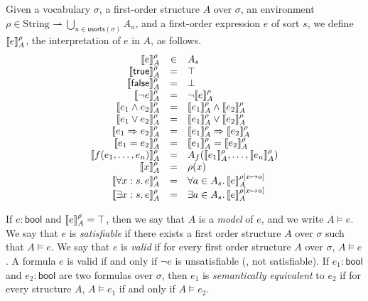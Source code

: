 Given a vocabulary $\sigma$,
  a first-order structure $A$ over $\sigma$,
  an environment $\rho \in \mathrm{String} \rightharpoonup \bigcup_{u\in\mathsf{usorts}(\sigma)} A_u$,
  and a first-order expression $e$ of sort $s$,
  we define $\llbracket{e}\rrbracket_A^\rho$,
  the interpretation of $e$ in $A$, as follows.
\begin{gather*}
  \begin{array}{rcl}
  \llbracket{e}\rrbracket_A^\rho &\in& A_s\\
  \llbracket{\mathsf{true}}\rrbracket_A^\rho &=& \top\\
  \llbracket{\mathsf{false}}\rrbracket_A^\rho &=& \bot\\
  \llbracket{\lnot e}\rrbracket_A^\rho &=& \lnot \llbracket{e}\rrbracket_A^\rho\\
  \llbracket{e_1 \land e_2}\rrbracket_A^\rho &=& \llbracket{e_1}\rrbracket_A^\rho \land \llbracket{e_2}\rrbracket_A^\rho\\
  \llbracket{e_1 \lor e_2}\rrbracket_A^\rho &=& \llbracket{e_1}\rrbracket_A^\rho \lor \llbracket{e_2}\rrbracket_A^\rho\\
  \llbracket{e_1 \Rightarrow e_2}\rrbracket_A^\rho &=& \llbracket{e_1}\rrbracket_A^\rho \Rightarrow \llbracket{e_2}\rrbracket_A^\rho\\
  \llbracket{e_1 = e_2}\rrbracket_A^\rho &=& \llbracket{e_1}\rrbracket_A^\rho = \llbracket{e_2}\rrbracket_A^\rho\\
  \llbracket{f(e_1, \dots, e_n)}\rrbracket_A^\rho &=& A_f(\llbracket{e_1}\rrbracket_A^\rho, \dots, \llbracket{e_n}\rrbracket_A^\rho)  \\
  \llbracket{x}\rrbracket_A^\rho &=& \rho(x) \\
  \llbracket{\forall x : s.\, e}\rrbracket_A^\rho &=& \forall a\in A_s.\, \llbracket{e}\rrbracket_A^{\rho[x\mapsto a]}\\
  \llbracket{\exists x : s.\, e}\rrbracket_A^\rho &=& \exists a\in A_s.\, \llbracket{e}\rrbracket_A^{\rho[x\mapsto a]}\\
  \end{array}
\end{gather*}

If $e : \mathsf{bool}$ and $\llbracket{e}\rrbracket_A^\rho = \top$,
  then we say that $A$ is a \emph{model} of $e$,
  and we write $A \models e$.
We say that $e$ is \emph{satisfiable} if there exists a first order structure $A$ over $\sigma$ such that $A\models e$.
We say that $e$ is \emph{valid} if for every first order structure $A$ over $\sigma$, $A\models e$.
A formula $e$ is valid if and only if $\neg e$ is unsatisfiable (\ie, not satisfiable).
%
If $e_1 : \mathsf{bool}$ and $e_2 : \mathsf{bool}$ are two formulas over $\sigma$,
then $e_1$  is \emph{semantically equivalent} to $e_2$ if for every structure $A$,
$A\models e_1$ if and only if $A\models e_2$.

